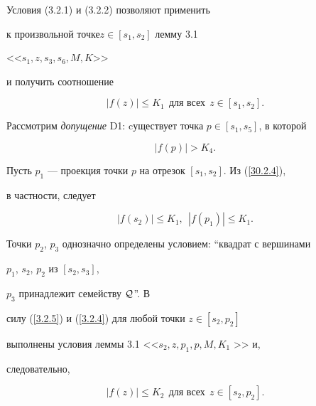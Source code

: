 \begin{pf}


Условия (3.2.1) и (3.2.2) позволяют применить 


к произвольной точке\linebreak $z\in [s_1, s_2]$ лемму 3.1


<<$s_1, z, s_3, s_6, M, K$>> 


и получить соотношение


\begin{equation}


\label{30.2.4}


|f(z)| \leq K_1 \ \ \text{для всех} \ \ z\in [s_1,s_2]. 


\end{equation} 


Рассмотрим {\it допущение} D1: cуществует точка $p\in [s_1, s_5]$, в которой 


\begin{equation}


\label{3.2.4}


|f(p)| > K_4.


\end{equation}


Пусть $p_1$ --- проекция точки $p$ на отрезок $[s_1,s_2]$. Из (\ref{30.2.4}), 


в частности, следует


\begin{equation}


\label{3.2.5}


|f(s_2)| \leq K_1, \ \ |f(p_1)| \leq K_1 .


\end{equation}


Точки $p_2$, $p_3$ однозначно определены условием: ``квадрат с вершинами 


$p_1$, $s_2$, $p_2$ из $[s_2, s_3]$,


$p_3$ принадлежит семейству ${\cal Q}$''. В 


силу (\ref{3.2.5}) и (\ref{3.2.4}) для любой точки $z\in [s_2, p_2]$ 


выполнены условия леммы 3.1 <<$s_2, z, p_1, p, M, K_1$ >> и, 


следовательно, 


\begin{equation}


\label{3.2.6}


|f(z)| \leq K_2 \ \ \text{для всех} \ \ z\in [s_2, p_2].


\end{equation} 



\end{pf}

